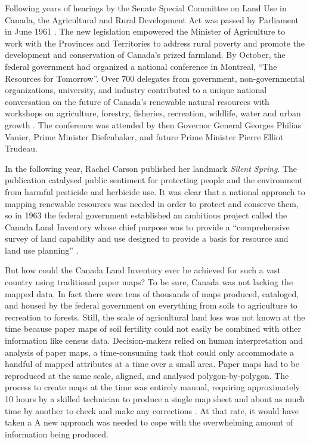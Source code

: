 \documentclass[
]{book}
\begin{document}
Following years of hearings by the Senate Special Committee on Land Use in Canada, the Agricultural and Rural Development Act was passed by Parliament in June 1961 \citep{mccrorie_arda_1969}. The new legislation empowered the Minister of Agriculture to work with the Provinces and Territories to address rural poverty and promote the development and conservation of Canada's prized farmland. By October, the federal government had organized a national conference in Montreal, ``The Resources for Tomorrow''. Over 700 delegates from government, non-governmental organizations, university, and industry contributed to a unique national conversation on the future of Canada's renewable natural resources with workshops on agriculture, forestry, fisheries, recreation, wildlife, water and urban growth \citep{gray_resources_1962}. The conference was attended by then Governor General Georges Philias Vanier, Prime Minister Diefenbaker, and future Prime Minister Pierre Elliot Trudeau.

In the following year, Rachel Carson published her landmark \emph{Silent Spring}. The publication catalysed public sentiment for protecting people and the environment from harmful pesticide and herbicide use. It was clear that a national approach to mapping renewable resources was needed in order to protect and conserve them, so in 1963 the federal government established an ambitious project called the Canada Land Inventory whose chief purpose was to provide a ``comprehensive survey of land capability and use designed to provide a basis for resource and land use planning'' \citep{department_of_regional_economic_expansion_canada_1965}.

But how could the Canada Land Inventory ever be achieved for such a vast country using traditional paper maps? To be sure, Canada was not lacking the mapped data. In fact there were tens of thousands of maps produced, cataloged, and housed by the federal government on everything from soils to agriculture to recreation to forests. Still, the scale of agricultural land loss was not known at the time because paper maps of soil fertility could not easily be combined with other information like census data. Decision-makers relied on human interpretation and analysis of paper maps, a time-consuming task that could only accommodate a handful of mapped attributes at a time over a small area. Paper maps had to be reproduced at the same scale, aligned, and analysed polygon-by-polygon. The process to create maps at the time was entirely manual, requiring approximately 10 hours by a skilled technician to produce a single map sheet and about as much time by another to check and make any corrections \citep{tomlinson_application_1974}. At that rate, it would have taken a A new approach was needed to cope with the overwhelming amount of information being produced.
\end{document}
